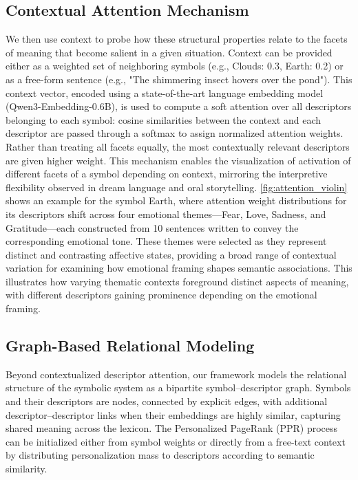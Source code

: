 \documentclass[final,creativeai]{article}
\begin{document}
\subsection{Contextual Attention Mechanism}
We then use context to probe how these structural properties relate to the facets of meaning that become salient in a given situation. Context can be provided either as a weighted set of neighboring symbols (e.g., Clouds: 0.3, Earth: 0.2) or as a free-form sentence (e.g., "The shimmering insect hovers over the pond"). This context vector, encoded using a state-of-the-art language embedding model (Qwen3-Embedding-0.6B), is used to compute a soft attention over all descriptors belonging to each symbol: cosine similarities between the context and each descriptor are passed through a softmax to assign normalized attention weights. Rather than treating all facets equally, the most contextually relevant descriptors are given higher weight. This mechanism enables the visualization of activation of different facets of a symbol depending on context, mirroring the interpretive flexibility observed in dream language and oral storytelling. \ref{fig:attention_violin} shows an example for the symbol Earth, where attention weight distributions for its descriptors shift across four emotional themes—Fear, Love, Sadness, and Gratitude—each constructed from 10 sentences written to convey the corresponding emotional tone. These themes were selected as they represent distinct and contrasting affective states, providing a broad range of contextual variation for examining how emotional framing shapes semantic associations. This illustrates how varying thematic contexts foreground distinct aspects of meaning, with different descriptors gaining prominence depending on the emotional framing.

\subsection{Graph-Based Relational Modeling}
Beyond contextualized descriptor attention, our framework models the relational structure of the symbolic system as a bipartite symbol–descriptor graph. Symbols and their descriptors are nodes, connected by explicit edges, with additional descriptor–descriptor links when their embeddings are highly similar, capturing shared meaning across the lexicon. The Personalized PageRank (PPR) \citep{lofgren_personalized_2016} process can be initialized either from symbol weights or directly from a free-text context by distributing personalization mass to descriptors according to semantic similarity.
\end{document}
